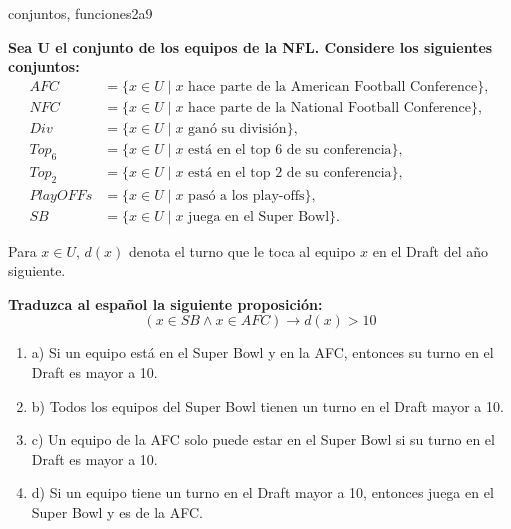 \documentclass{article}
\begin{document}
\begin{question}{21}{conjuntos, funciones}{2}{a}{9}{
\textbf{Sea U el conjunto de los equipos de la NFL. Considere los siguientes conjuntos:}
\[
\begin{aligned}
AFC &= \{ x \in U \mid x \text{ hace parte de la American Football Conference}\},\\
NFC &= \{ x \in U \mid x \text{ hace parte de la National Football Conference}\},\\
Div &= \{ x \in U \mid x \text{ ganó su división}\},\\
Top_6 &= \{ x \in U \mid x \text{ está en el top 6 de su conferencia}\},\\
Top_2 &= \{ x \in U \mid x \text{ está en el top 2 de su conferencia}\},\\
PlayOFFs &= \{ x \in U \mid x \text{ pasó a los play-offs}\},\\
SB &= \{ x \in U \mid x \text{ juega en el Super Bowl}\}.
\end{aligned}
\]

Para $x \in U$, $d(x)$ denota el turno que le toca al equipo $x$ en el Draft del año siguiente. \smallskip

\textbf{Traduzca al español la siguiente proposición:}
\[
(x \in SB \land x \in AFC)\to d(x)>10
\]

\begin{enumerate}
    \item a) Si un equipo está en el Super Bowl y en la AFC, entonces su turno en el Draft es mayor a 10.  
    \item b) Todos los equipos del Super Bowl tienen un turno en el Draft mayor a 10.  
    \item c) Un equipo de la AFC solo puede estar en el Super Bowl si su turno en el Draft es mayor a 10.  
    \item d) Si un equipo tiene un turno en el Draft mayor a 10, entonces juega en el Super Bowl y es de la AFC.  
\end{enumerate}
}
\end{question}
\end{document}
